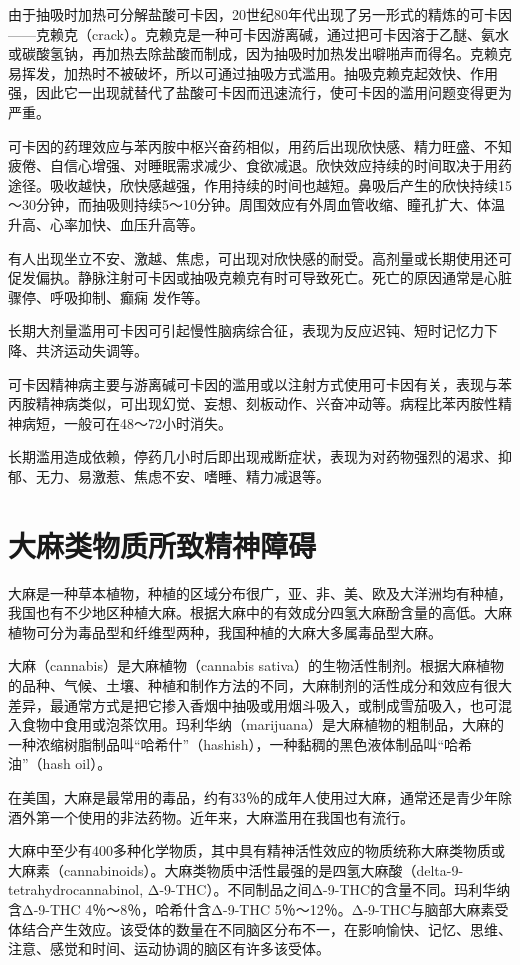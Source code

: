 由于抽吸时加热可分解盐酸可卡因，20世纪80年代出现了另一形式的精炼的可卡因------克赖克（crack）。克赖克是一种可卡因游离碱，通过把可卡因溶于乙醚、氨水或碳酸氢钠，再加热去除盐酸而制成，因为抽吸时加热发出噼啪声而得名。克赖克易挥发，加热时不被破坏，所以可通过抽吸方式滥用。抽吸克赖克起效快、作用强，因此它一出现就替代了盐酸可卡因而迅速流行，使可卡因的滥用问题变得更为严重。

可卡因的药理效应与苯丙胺中枢兴奋药相似，用药后出现欣快感、精力旺盛、不知疲倦、自信心增强、对睡眠需求减少、食欲减退。欣快效应持续的时间取决于用药途径。吸收越快，欣快感越强，作用持续的时间也越短。鼻吸后产生的欣快持续15～30分钟，而抽吸则持续5～10分钟。周围效应有外周血管收缩、瞳孔扩大、体温升高、心率加快、血压升高等。

有人出现坐立不安、激越、焦虑，可出现对欣快感的耐受。高剂量或长期使用还可促发偏执。静脉注射可卡因或抽吸克赖克有时可导致死亡。死亡的原因通常是心脏骤停、呼吸抑制、癫痫
发作等。

长期大剂量滥用可卡因可引起慢性脑病综合征，表现为反应迟钝、短时记忆力下降、共济运动失调等。

可卡因精神病主要与游离碱可卡因的滥用或以注射方式使用可卡因有关，表现与苯丙胺精神病类似，可出现幻觉、妄想、刻板动作、兴奋冲动等。病程比苯丙胺性精神病短，一般可在48～72小时消失。

长期滥用造成依赖，停药几小时后即出现戒断症状，表现为对药物强烈的渴求、抑郁、无力、易激惹、焦虑不安、嗜睡、精力减退等。

\section{大麻类物质所致精神障碍}

大麻是一种草本植物，种植的区域分布很广，亚、非、美、欧及大洋洲均有种植，我国也有不少地区种植大麻。根据大麻中的有效成分四氢大麻酚含量的高低。大麻植物可分为毒品型和纤维型两种，我国种植的大麻大多属毒品型大麻。

大麻（cannabis）是大麻植物（cannabis
sativa）的生物活性制剂。根据大麻植物的品种、气候、土壤、种植和制作方法的不同，大麻制剂的活性成分和效应有很大差异，最通常方式是把它掺入香烟中抽吸或用烟斗吸入，或制成雪茄吸入，也可混入食物中食用或泡茶饮用。玛利华纳（marijuana）是大麻植物的粗制品，大麻的一种浓缩树脂制品叫“哈希什”（hashish），一种黏稠的黑色液体制品叫“哈希油”（hash
oil）。

在美国，大麻是最常用的毒品，约有33％的成年人使用过大麻，通常还是青少年除酒外第一个使用的非法药物。近年来，大麻滥用在我国也有流行。

大麻中至少有400多种化学物质，其中具有精神活性效应的物质统称大麻类物质或大麻素（cannabinoids）。大麻类物质中活性最强的是四氢大麻酸（delta-9-tetrahydrocannabinol,
Δ-9-THC）。不同制品之间Δ-9-THC的含量不同。玛利华纳含Δ-9-THC
4％～8％，哈希什含Δ-9-THC
5％～12％。Δ-9-THC与脑部大麻素受体结合产生效应。该受体的数量在不同脑区分布不一，在影响愉快、记忆、思维、注意、感觉和时间、运动协调的脑区有许多该受体。

